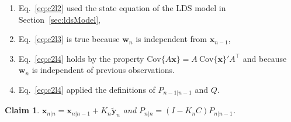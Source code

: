 \documentclass[12pt]{article}
\newtheorem{claim}{Claim}
\begin{document}
\begin{enumerate}
    \item Eq.~\ref{eq:c2l2} used the state equation of the LDS model in
        Section~\ref{sec:ldsModel},
    \item Eq.~\ref{eq:c2l3} is true because $\mathbf{w}_n$ is independent from
        $\mathbf{x}_{n-1}$,
    \item Eq.~\ref{eq:c2l4} holds by the property
        $\text{Cov}\{A\mathbf{x}\}=A\ \text{Cov}\{\mathbf{x}\}' A^\intercal$ and
        because $\mathbf{w}_n$ is independent of previous observations.
    \item Eq.~\ref{eq:c2l4} applied the definitions of $P_{n-1|n-1}$ and $Q$.
\end{enumerate}

\begin{claim}
    $\mathbf{x}_{n|n}=\mathbf{x}_{n|n-1}+K_n\tilde{\mathbf{y}}_n$ and
    $P_{n|n}=(I-K_nC)P_{n|n-1}$.
    \label{claim:filteringMeanAndCov}
\end{claim}
\end{document}

